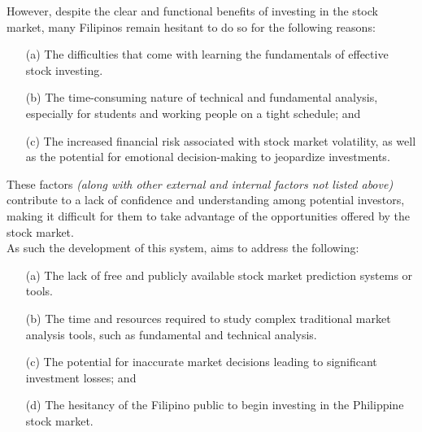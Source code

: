 However, despite the clear and functional benefits of investing in the stock market, 
many Filipinos remain hesitant to do so for the following reasons:
\begin{itemize}
  \item[(a)] The difficulties that come with learning the fundamentals 
  of effective stock investing.
  \item[(b)] The time-consuming nature of technical and fundamental analysis, 
  especially for students and working people on a tight schedule; and
  \item[(c)] The increased financial risk associated with stock market volatility, 
  as well as the potential for emotional decision-making to jeopardize investments.
\end{itemize}

These factors \textit{(along with other external and internal factors not listed above)}
contribute to a lack of confidence and understanding among potential investors, 
making it difficult for them to take advantage of the opportunities offered 
by the stock market.
\hfill \\

As such the development of this system, aims to address the following:
\begin{itemize}
  \item[(a)] The lack of free and publicly available 
  stock market prediction systems or tools.
  \item[(b)] The time and resources required to study complex traditional 
  market analysis tools, such as fundamental and technical analysis.
  \item[(c)] The potential for inaccurate market decisions
  leading to significant investment losses; and
  \item[(d)] The hesitancy of the Filipino public to begin 
  investing in the Philippine stock market.
\end{itemize}
